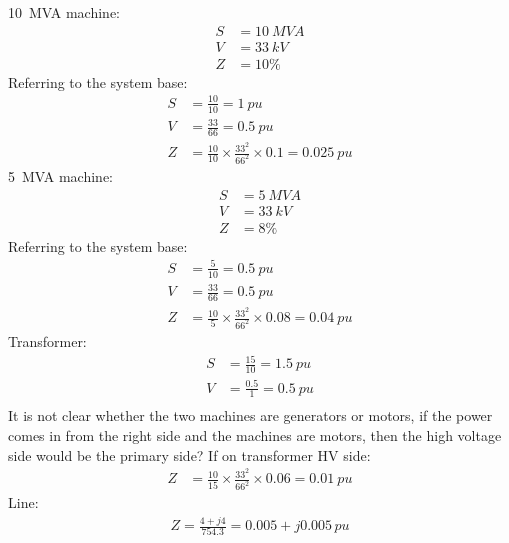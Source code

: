 \SI{10}{MVA} machine:
\begin{align}
    S &= \SI{10}{MVA}\\
    V &= \SI{33}{kV}\\
    Z &= 10\%
\end{align}
Referring to the system base:
\begin{align}
    S &= \frac{10}{10} = \SI{1}{pu}\\
    V &= \frac{33}{66} = \SI{0.5}{pu}\\
    Z &= \frac{10}{10}\times \frac{33^2}{66^2}\times 0.1 = \SI{0.025}{pu}
\end{align}
\SI{5}{MVA} machine:
\begin{align}
    S &= \SI{5}{MVA}\\
    V &= \SI{33}{kV}\\
    Z &= 8\%
\end{align}
Referring to the system base:
\begin{align}
    S &= \frac{5}{10} = \SI{0.5}{pu}\\
    V &= \frac{33}{66} = \SI{0.5}{pu}\\
    Z &= \frac{10}{5}\times \frac{33^2}{66^2} \times 0.08 = \SI{0.04}{pu}
\end{align}
Transformer:
\begin{align}
    S &= \frac{15}{10} = \SI{1.5}{pu}\\
    V &= \frac{0.5}{1} = \SI{0.5}{pu}\\
\end{align}
It is not clear whether the two machines are generators or motors, if the power comes in from the right side and the machines are motors, then the high voltage side would be the primary side? If on transformer HV side:
\begin{align}
    Z &= \frac{10}{15}\times \frac{33^2}{66^2} \times 0.06 = \SI{0.01}{pu}
\end{align}
Line: 
\begin{gather}
    Z = \frac{4+j4}{754.3} = 0.005 + j0.005\,\si{pu}
\end{gather}
